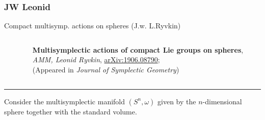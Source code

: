 \documentclass[handout,10pt]{beamer}
\newcommand{\extrarule}{
		{
			\color{UniGreen}
			\par\hspace*{-\dimexpr0.5\paperwidth-0.5\textwidth}\rule[0.5\baselineskip]{\paperwidth}{0.4pt}
			\vspace{-2em}
		}
}
\begin{document}
\subsubsection{JW Leonid}
	\begin{frame}[t]{Compact multisymp. actions on spheres \small (J.w. L.Ryvkin)}
		\begin{columns}[T]
			\begin{column}{0.2\textwidth}
				\centering
			\end{column}		
			\begin{column}{0.8\textwidth}
				\begin{center}
					\textbf{Multisymplectic actions of compact Lie groups on spheres}, \\
					\emph{AMM, Leonid Ryvkin}, \href{https://arxiv.org/abs/1906.08790}{arXiv:1906.08790};\\
					(Appeared in \emph{Journal of Symplectic Geometry})	
				\end{center}		
			\end{column}		
		\end{columns}				
		\extrarule
		\pause
		\vspace{1em}
		
		Consider the multisymplectic manifold $(S^n,\omega)$ given by the $n$-dimensional sphere together with the standard volume.
		\pause
		

\end{frame}
\end{document}
